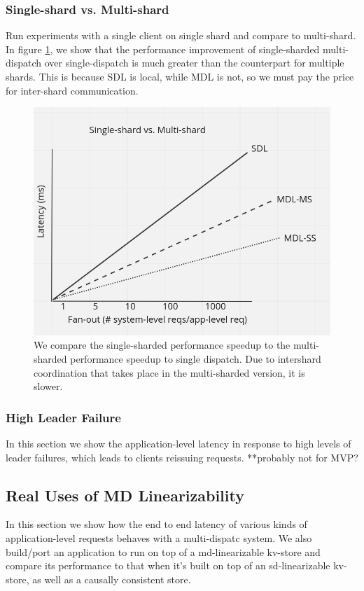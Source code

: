 \subsubsection{Single-shard vs. Multi-shard}
Run experiments with a single client on single shard and compare to multi-shard. In figure \ref{fig:ss-vs-ms}, we show that the performance improvement of single-sharded multi-dispatch over single-dispatch is much greater than the counterpart for multiple shards. This is because SDL is local, while MDL is not, so we must pay the price for inter-shard communication.
\begin{figure}[!htb]
\includegraphics[scale=.27]{single-shard-multi-shard.png}
\caption{We compare the single-sharded performance speedup to the multi-sharded performance speedup to single dispatch. Due to intershard coordination that takes place in the multi-sharded version, it is slower.}
\label{fig:ss-vs-ms}
\end{figure}

\subsubsection{High Leader Failure}
In this section we show the application-level latency in response to high levels of leader failures, which leads to clients reissuing requests.
**probably not for MVP?
\subsection{Real Uses of MD Linearizability}
In this section we show how the end to end latency of various kinds of application-level requests behaves with a multi-dispatc system. We also build/port an application to run on top of a md-linearizable kv-store and compare its performance to that when it's built on top of an sd-linearizable kv-store, as well as a causally consistent store.

